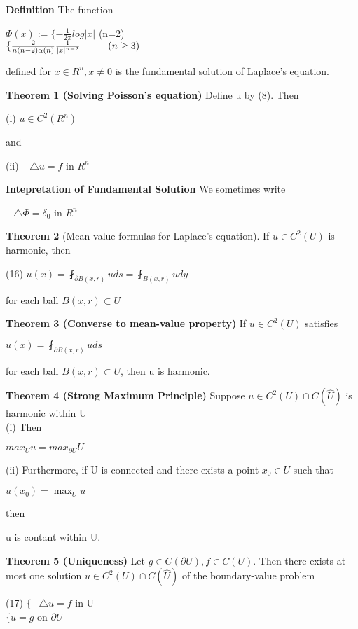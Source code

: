 \documentclass{article}
\newcommand\tab[1][1cm]{\hspace*{#1}}
\begin{document}
\textbf {Definition} The function
\begin{center}
$\Phi (x) := \{ -\frac{1}{2 \pi} log |x|$ \tab (n=2) \\
\tab \tab $\{\frac{2}{n(n-2)\alpha (n)} \frac{1}{|x|^{n-2}} \tab (n \geq 3)$ 
\end{center}
defined for $x \in R^n, x \neq 0$ is the fundamental solution of Laplace's equation.

\textbf {Theorem 1 (Solving Poisson's equation)} Define u by (8). Then
\begin{center}
(i) $u \in C^2 (R^n)$
\end{center}
and 
\begin{center}
(ii) $-\triangle u = f$ in $R^n$
\end{center}

\textbf {Intepretation of Fundamental Solution} We sometimes write
\begin{center}
$- \triangle \Phi = \delta_0$ in $R^n$
\end{center}

\textbf {Theorem 2} (Mean-value formulas for Laplace's equation). If $u \in C^2(U)$ is harmonic, then
\begin{center}
(16) \tab $u(x) = \fint_{\partial B(x,r)} uds = \fint_{B(x,r)} u dy$
\end{center}
for each ball $B(x,r) \subset U$

\textbf {Theorem 3 (Converse to mean-value property)} If $u \in C^2(U)$ satisfies 
\begin{center}
$u(x) = \fint_{\partial B(x,r)} uds$
\end{center}
for each ball $B(x,r) \subset U$, then u is harmonic.

\textbf {Theorem 4 (Strong Maximum Principle)} Suppose $u \in C^2(U) \cap C(\hat{U})$ is harmonic within U \\
(i) Then
\begin{center}
$max_U u = max_{\partial U} U$
\end{center}
(ii) Furthermore, if U is connected and there exists a point $x_0 \in U$ such that 
\begin{center}
$u(x_0) = \max_{U} u$
\end{center}
then
\begin{center}
u is contant within U.
\end{center}

\textbf {Theorem 5 (Uniqueness)} Let $g \in C(\partial U), f \in C(U)$. Then there exists at most one solution $u \in C^2 (U) \cap C(\hat{U})$ of the boundary-value problem
\begin{center}
(17) \tab $\{ - \triangle u = f$ in U \\
\tab $\{ u = g$ on $\partial U$
\end{center}
\end{document}
